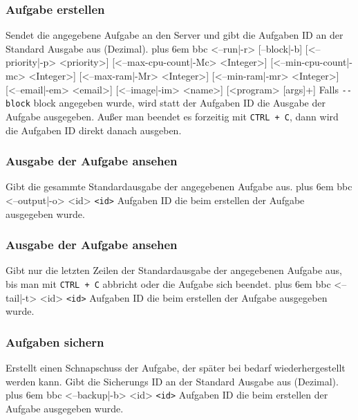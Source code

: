 \documentclass[a4paper,12pt]{article}
\makeatletter
\newenvironment{mycode}
 {\def\@xobeysp{\ }\verbatim\rightskip=0pt plus 6em\relax}
 {\endverbatim}
\makeatother
\begin{document}
\subsubsection{Aufgabe erstellen}
Sendet die angegebene Aufgabe an den Server und gibt die Aufgaben ID an der Standard Ausgabe aus (Dezimal).
\begin{mycode}
bbc <--run|-r> [--block|-b] [<--priority|-p> <priority>] [<--max-cpu-count|-Mc> <Integer>] [<--min-cpu-count|-mc> <Integer>] [<--max-ram|-Mr> <Integer>] [<--min-ram|-mr> <Integer>] [<--email|-em> <email>] [<--image|-im> <name>] [<program> [args]+]
\end{mycode}
Falls \texttt{-{}-block} block angegeben wurde, wird statt der Aufgaben ID die Ausgabe der Aufgabe ausgegeben.
Außer man beendet es forzeitig mit \texttt{CTRL + C}, dann wird die Aufgaben ID direkt danach ausgeben.

\subsubsection{Ausgabe der Aufgabe ansehen}
Gibt die gesammte Standardausgabe der angegebenen Aufgabe aus.
\begin{mycode}
bbc <--output|-o> <id>
\end{mycode}
\texttt{<id>} Aufgaben ID die beim erstellen der Aufgabe ausgegeben wurde.

\subsubsection{Ausgabe der Aufgabe ansehen}
Gibt nur die letzten Zeilen der Standardausgabe der angegebenen Aufgabe aus, bis man mit \texttt{CTRL + C} abbricht oder die Aufgabe sich beendet.
\begin{mycode}
bbc <--tail|-t> <id>
\end{mycode}
\texttt{<id>} Aufgaben ID die beim erstellen der Aufgabe ausgegeben wurde.

\subsubsection{Aufgaben sichern}
Erstellt einen Schnapschuss der Aufgabe, der später bei bedarf wiederhergestellt werden kann.
Gibt die Sicherungs ID an der Standard Ausgabe aus (Dezimal).
\begin{mycode}
bbc <--backup|-b> <id>
\end{mycode}
\texttt{<id>} Aufgaben ID die beim erstellen der Aufgabe ausgegeben wurde.
\end{document}
